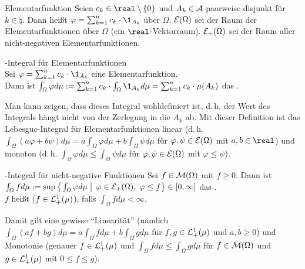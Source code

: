 \begin{Def}{Elementarfunktion}
    Seien $c_k \in \real \setminus \{0\}$ und $A_k \in \mathcal{A}$ paarweise disjunkt für $k \in \natural$.
    Dann heißt $\varphi = \sum_{k=1}^n c_k \cdot \1_{A_k}$  über
    $\Omega$.
    $\mathcal{E}(\Omega)$ sei der Raum der Elementarfunktionen über $\Omega$
    (ein $\real$-Vektorraum).
    $\mathcal{E}_+(\Omega)$ sei der Raum aller nicht-negativen Elementarfunktionen.
\end{Def}

\begin{Def}{-Integral für Elementarfunktionen}\\
    Sei $\varphi = \sum_{k=1}^n c_k \cdot \1_{A_k}$ eine Elementarfunktion.\\
    Dann ist $\int_\Omega \varphi d\mu := \sum_{k=1}^n c_k \cdot \int_{\Omega} \1_{A_k} d\mu =
    \sum_{k=1}^n c_k \cdot \mu(A_k)$ das .
\end{Def}

\begin{Bem}
    Man kann zeigen, dass dieses Integral wohldefiniert ist, d.\,h. der Wert des Integrals
    hängt nicht von der Zerlegung in die $A_k$ ab.
    Mit dieser Definition ist das Lebesgue-Integral für Elementarfunktionen linear
    (d.\,h. $\int_\Omega (a\varphi + b\psi) d\mu = a \int_\Omega \varphi d\mu +
    b \int_\Omega \psi d\mu$ für $\varphi, \psi \in \mathcal{E}(\Omega)$ mit $a, b \in \real$)
    und monoton (d.\,h. $\int_\Omega \varphi d\mu \le \int_\Omega \psi d\mu$ für
    $\varphi, \psi \in \mathcal{E}(\Omega)$ mit $\varphi \le \psi$).
\end{Bem}

\begin{Def}{-Integral für nicht-negative Funktionen}
    Sei $f \in \mathcal{M}(\Omega)$ mit $f \ge 0$.
    Dann ist $\int_\Omega f d\mu := \sup\left\{\left.\int_\Omega \varphi d\mu \;\right|\;
    \varphi \in \mathcal{E}_+(\Omega),\; \varphi \le f\right\} \in [0, \infty]$
    das .\\
    $f$ heißt  ($f \in \mathcal{L}^1_+(\mu)$), falls
    $\int_\Omega f d\mu < \infty$.
\end{Def}

\begin{Bem}
    Damit gilt eine gewisse "`Linearität"'
    (nämlich $\int_\Omega (af + bg) d\mu = a \int_\Omega f d\mu + b \int_\Omega g d\mu$
    für $f, g \in \mathcal{L}^1_+(\mu)$ und $a, b \ge 0$)
    und Monotonie (genauer $f \in \mathcal{L}^1_+(\mu)$ und $\int_\Omega f d\mu \le \int_\Omega g d\mu$
    für $f \in \mathcal{M}(\Omega)$ und $g \in \mathcal{L}^1_+(\mu)$ mit $0 \le f \le g$).
\end{Bem}

